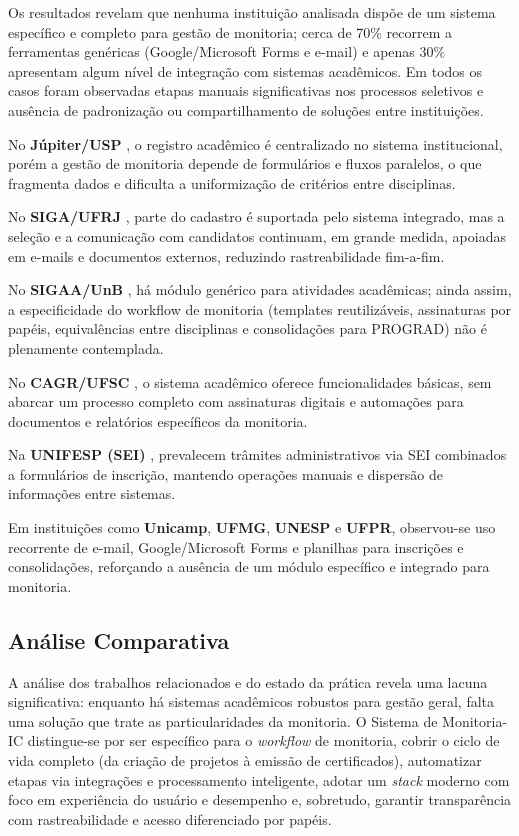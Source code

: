 \documentclass[portuguese]{sbc2025}%
\begin{document}
Os resultados revelam que nenhuma instituição analisada dispõe de um sistema específico e completo para gestão de monitoria; cerca de 70\% recorrem a ferramentas genéricas (Google/Microsoft Forms e e-mail) e apenas 30\% apresentam algum nível de integração com sistemas acadêmicos. Em todos os casos foram observadas etapas manuais significativas nos processos seletivos e ausência de padronização ou compartilhamento de soluções entre instituições.

No \textbf{Júpiter/USP} \cite{USPJupiter}, o registro acadêmico é centralizado no sistema institucional, porém a gestão de monitoria depende de formulários e fluxos paralelos, o que fragmenta dados e dificulta a uniformização de critérios entre disciplinas.

No \textbf{SIGA/UFRJ} \cite{UFRJ_SIGA}, parte do cadastro é suportada pelo sistema integrado, mas a seleção e a comunicação com candidatos continuam, em grande medida, apoiadas em e-mails e documentos externos, reduzindo rastreabilidade fim-a-fim.

No \textbf{SIGAA/UnB} \cite{UnB_SIGAA}, há módulo genérico para atividades acadêmicas; ainda assim, a especificidade do workflow de monitoria (templates reutilizáveis, assinaturas por papéis, equivalências entre disciplinas e consolidações para PROGRAD) não é plenamente contemplada.

No \textbf{CAGR/UFSC} \cite{UFSC_CAGR}, o sistema acadêmico oferece funcionalidades básicas, sem abarcar um processo completo com assinaturas digitais e automações para documentos e relatórios específicos da monitoria.

Na \textbf{UNIFESP (SEI)} \cite{UNIFESP_SEI}, prevalecem trâmites administrativos via SEI combinados a formulários de inscrição, mantendo operações manuais e dispersão de informações entre sistemas.

Em instituições como \textbf{Unicamp}, \textbf{UFMG}, \textbf{UNESP} e \textbf{UFPR}, observou-se uso recorrente de e-mail, Google/Microsoft Forms e planilhas para inscrições e consolidações, reforçando a ausência de um módulo específico e integrado para monitoria.

\subsection{Análise Comparativa}

A análise dos trabalhos relacionados e do estado da prática revela uma lacuna significativa: enquanto há sistemas acadêmicos robustos para gestão geral, falta uma solução que trate as particularidades da monitoria. O Sistema de Monitoria-IC distingue-se por ser específico para o \textit{workflow} de monitoria, cobrir o ciclo de vida completo (da criação de projetos à emissão de certificados), automatizar etapas via integrações e processamento inteligente, adotar um \textit{stack} moderno com foco em experiência do usuário e desempenho e, sobretudo, garantir transparência com rastreabilidade e acesso diferenciado por papéis.
\end{document}
